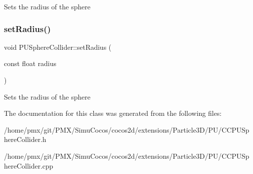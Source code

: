 Sets the radius of the sphere \mbox{\label{classPUSphereCollider_ab3063655165ec183d0e0c8d49a61e29c}} 
\subsubsection{\texorpdfstring{set\+Radius()}{setRadius()}\hspace{0.1cm}{\footnotesize\ttfamily [2/2]}}
{\footnotesize\ttfamily void P\+U\+Sphere\+Collider\+::set\+Radius (\begin{DoxyParamCaption}\item[{const float}]{radius }\end{DoxyParamCaption})}

Sets the radius of the sphere 

The documentation for this class was generated from the following files\+:\begin{DoxyCompactItemize}
\item 
/home/pmx/git/\+P\+M\+X/\+Simu\+Cocos/cocos2d/extensions/\+Particle3\+D/\+P\+U/C\+C\+P\+U\+Sphere\+Collider.\+h\item 
/home/pmx/git/\+P\+M\+X/\+Simu\+Cocos/cocos2d/extensions/\+Particle3\+D/\+P\+U/C\+C\+P\+U\+Sphere\+Collider.\+cpp\end{DoxyCompactItemize}
